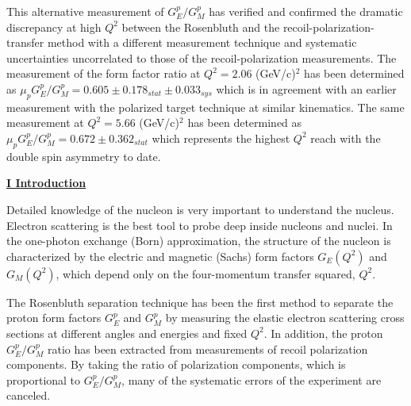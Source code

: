 \documentclass[12pt]{article}
\begin{document}
This alternative measurement of $G_E^p/G_M^p$ has verified and confirmed the dramatic discrepancy at high $Q^2$ between the Rosenbluth and the recoil-polarization-transfer method with a different measurement technique and systematic uncertainties uncorrelated to those of the recoil-polarization measurements. The measurement of the form factor ratio at $Q^2=2.06$ (GeV/c)$^2$ has been determined as $\mu_p G_E^p/G_M^p=0.605\pm0.178_{stat}\pm0.033_{sys}$ which is in agreement with an earlier measurement with the polarized target technique at similar kinematics. The same measurement at $Q^2=5.66$ (GeV/c)$^2$ has been determined as $\mu_p G_E^p/G_M^p=0.672\pm0.362_{stat}$ which represents the highest $Q^2$ reach with the double spin asymmetry to date.

{
\raggedleft
\underline{\textbf{I Introduction}}
}

Detailed knowledge of the nucleon is very important to understand the nucleus. Electron scattering is the best tool to probe deep inside nucleons and nuclei. In the one-photon exchange (Born) approximation, the structure of the nucleon is characterized by the electric and magnetic (Sachs) form factors $G_E (Q^2 )$ and $G_M (Q^2 )$, which depend only on the four-momentum transfer squared, $Q^2$. 

The Rosenbluth separation technique has been the first method to separate the proton form factors $G_E^p$ and $G_M^p$ by measuring the elastic electron scattering cross sections at different angles and energies and fixed $Q^2$. In addition, the proton $G_E^p/G_M^p$ ratio has been extracted from measurements of recoil polarization components. By taking the ratio of polarization components, which is proportional to $G_E^p/G_M^p$, many of the systematic errors of the experiment are canceled. 
\end{document}
